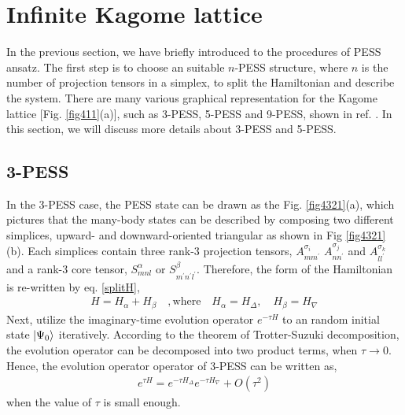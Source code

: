\section{Infinite Kagome lattice}
In the previous section, we have briefly introduced to the procedures of PESS ansatz. The first step is to  choose an suitable $n$-PESS structure, where $n$ is the number of projection tensors in a simplex, to split the Hamiltonian and describe the system. There are many various graphical representation for the Kagome lattice [Fig. \ref{fig411}(a)], such as 3-PESS, 5-PESS and 9-PESS, shown in ref. \cite{}. In this section, we will discuss more details about 3-PESS and 5-PESS.
\subsection{3-PESS}
In the 3-PESS case, the PESS state can be drawn as the Fig. \ref{fig4321}(a), which pictures that the many-body states can be described by composing two different simplices, upward- and downward-oriented triangular as shown in Fig \ref{fig4321}(b). Each simplices contain three rank-3 projection tensors, $A^{\sigma_i}_{mm^{\prime}}$ $A^{\sigma_j}_{nn^{\prime}}$ and $A^{\sigma_k}_{ll^{\prime}}$ and a rank-3 core tensor, $S_{mnl}^{\alpha}$ or $S_{m^{\prime}n^{\prime}l^{\prime}}^{\beta}$. Therefore, the form of the Hamiltonian is re-written by eq. \ref{splitH},
\begin{align}
	H = H_{\alpha} + H_{\beta} \quad,\text{where} \quad H_{\alpha} = H_{\Delta},\quad H_{\beta} = H_{\nabla}
\end{align}
Next, utilize the imaginary-time evolution operator $e^{-\tau H}$ to an random initial state $\Ket{\Psi_{0}}$ iteratively. According to the theorem of Trotter-Suzuki decomposition, the evolution operator can be decomposed into two product terms, when $\tau \rightarrow 0$. Hence, the evolution operator operator of 3-PESS can be written as, 
\begin{align}
	\label{eq415}
	e^{\tau H} = e^{-\tau H_{\Delta}} e^{-\tau H_{\nabla}} + O(\tau^2)
\end{align}
when the value of $\tau$ is small enough. 
\label{3pess}
